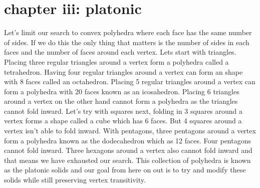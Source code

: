 \documentclass{article}
\begin{document}
\section*{chapter iii: platonic}
Let's limit our search to convex polyhedra where each face has the same number of sides. If we do this the only thing that matters is the number of sides in each faces and the number of faces around each vertex. Lets start with triangles. Placing three regular triangles around a vertex form a polyhedra called a tetrahedron. Having four regular triangles around a vertex can form an shape with 8 faces called an octahedron. Placing 5 regular triangles around a vertex can form a polyhedra with 20 faces known as an icosahedron. Placing 6 triangles around a vertex on the other hand cannot form a polyhedra as the triangles cannot fold inward. Let's try with squares next, folding in 3 squares around a vertex forms a shape called a cube which has 6 faces. But 4 squares around a vertex isn't able to fold inward. With pentagons, three pentagons around a vertex form a polyhedra known as the dodecahedron which as 12 faces. Four pentagons cannot fold inward. Three hexagons around a vertex also cannot fold inward and that means we have exhausted our search. This collection of polyhedra is known as the platonic solids and our goal from here on out is to try and modify these solids while still preserving vertex transitivity.
\end{document}
